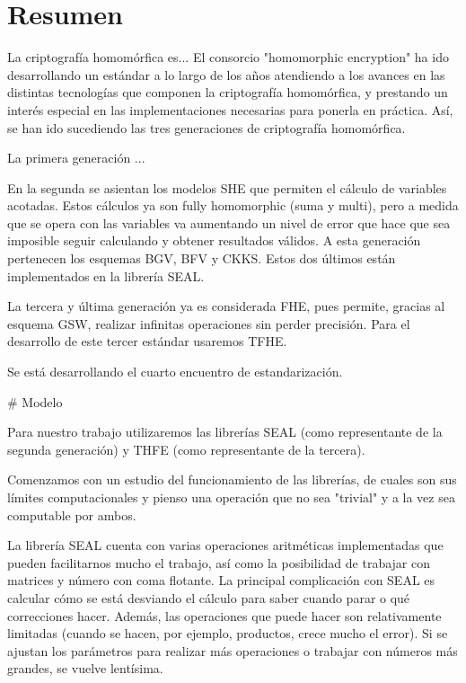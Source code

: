 \chapter*{Resumen}


La criptografía homomórfica es... El consorcio "homomorphic encryption" ha ido desarrollando un estándar a lo largo de los años atendiendo a los avances en las distintas tecnologías que componen la criptografía homomórfica, y prestando un interés especial en las implementaciones necesarias para ponerla en práctica. Así, se han ido sucediendo las tres generaciones de criptografía homomórfica. 

La primera generación ...

En la segunda se asientan los modelos SHE que permiten el cálculo de variables acotadas. Estos cálculos ya son fully homomorphic (suma y multi), pero a medida que se opera con las variables va aumentando un nivel de error que hace que sea imposible seguir calculando y obtener resultados válidos. A esta generación pertenecen los esquemas BGV, BFV y CKKS. Estos dos últimos están implementados en la librería SEAL.

La tercera y última generación ya es considerada FHE, pues permite, gracias al esquema GSW, realizar infinitas operaciones sin perder precisión. Para el desarrollo de este tercer estándar usaremos TFHE.

Se está desarrollando el cuarto encuentro de estandarización.

# Modelo

Para nuestro trabajo utilizaremos las librerías SEAL (como representante de la segunda generación) y THFE (como representante de la tercera). 

Comenzamos con un estudio del funcionamiento de las librerías, de cuales son sus límites computacionales y pienso una operación que no sea "trivial" y a la vez sea computable por ambos. 

La librería SEAL cuenta con varias operaciones aritméticas implementadas que pueden facilitarnos mucho el trabajo, así como la posibilidad de trabajar con matrices y número con coma flotante. La principal complicación con SEAL es calcular cómo se está desviando el cálculo para saber cuando parar o qué correcciones hacer. Además, las operaciones que puede hacer son relativamente limitadas (cuando se hacen, por ejemplo, productos, crece mucho el error). Si se ajustan los parámetros para realizar más operaciones o trabajar con números más grandes, se vuelve lentísima.

